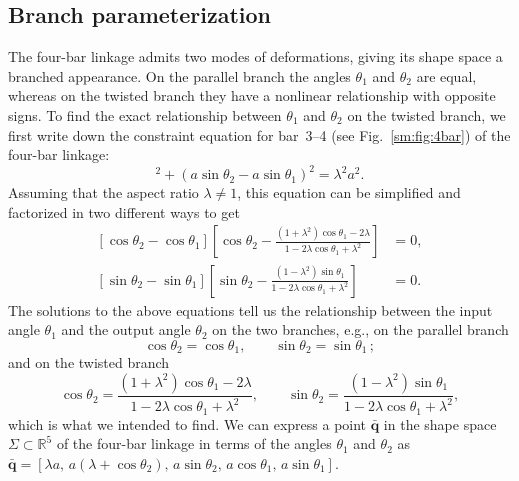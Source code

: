 \subsection{Branch parameterization}

The four-bar linkage admits two modes of deformations, giving its shape space a branched appearance.
On the parallel branch the angles $\theta_{1}$ and $\theta_{2}$ are equal, whereas on the twisted branch they have a nonlinear relationship with opposite signs.
To find the exact relationship between $\theta_{1}$ and $\theta_{2}$ on the twisted branch, we first write down the constraint equation for bar~3--4 (see Fig.~\ref{sm:fig:4bar}) of the four-bar linkage:
%
\begin{equation}
  [\lambda a + a(\cos{\theta_2} - \cos{\theta_1})]^2 + (a\sin{\theta_2} - a\sin{\theta_1})^2 = \lambda^2 a^2.
\end{equation}
%
Assuming that the aspect ratio $\lambda \ne 1$, this equation can be simplified and factorized in two different ways to get
%
\begin{subequations}
\begin{align}
  \left[\cos{\theta_2} - \cos{\theta_1}\right]\left[\cos{\theta_2} - \frac{(1 + \lambda^2)\cos{\theta_1} - 2\lambda}{1 - 2\lambda\cos{\theta_1} + \lambda^2}\right] &= 0,\\
  \left[\sin{\theta_2} - \sin{\theta_1}\right]\left[\sin{\theta_2} - \frac{(1 - \lambda^2)\sin{\theta_1}}{1 -2\lambda\cos{\theta_1} + \lambda^2}\right] &= 0.
\end{align}
\end{subequations}
%
The solutions to the above equations tell us the relationship between the input angle $\theta_1$ and the output angle $\theta_2$ on the two branches, e.g., on the parallel branch
%
\begin{equation}
  \cos\theta_2 = \cos\theta_1,\qquad
  \sin\theta_2 = \sin\theta_1\,;
  \label{sm:eq:parallel}
\end{equation}
%
and on the twisted branch
%
\begin{equation}
  \cos\theta_2 = \frac{(1 + \lambda^2)\cos{\theta_1} - 2\lambda}{1 - 2\lambda\cos{\theta_1} + \lambda^2}, \qquad
  \sin\theta_2 = \frac{(1 - \lambda^2)\sin{\theta_1}}{1 - 2\lambda\cos{\theta_1} + \lambda^2},
  \label{sm:eq:twisted}
\end{equation}
%
which is what we intended to find.
We can express a point $\bar{\bm{q}}$ in the shape space $\Sigma \subset \mathbb{R}^5$ of the four-bar linkage in terms of the angles $\theta_1$ and $\theta_2$ as $\bar{\bm{q}} = [\lambda a,\, a(\lambda + \cos{\theta_2}),\, a\sin{\theta_2},\, a\cos{\theta_1},\, a\sin{\theta_1}]$.

